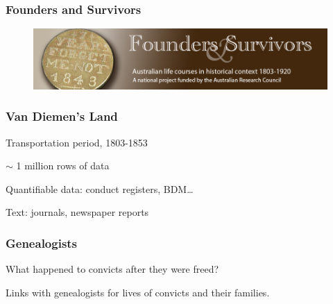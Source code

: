 \documentclass[ignorenonframetext,11pt]{beamer}
\begin{document}
\begin{frame}
\frametitle{Founders and Survivors}
\label{foundersandsurvivors}

\begin{figure}
	\label{foundersandsurvivors}
	\begin{center}
	\includegraphics[keepaspectratio,width=\textwidth, height=.75\textheight]{images/logo.jpg}
	\end{center}
	\end{figure}
	



\end{frame}
		

\begin{frame}
\frametitle{Van Diemen's Land}
\label{vandiemensland}

Transportation period, 1803-1853


\ensuremath{\sim} 1 million rows of data


Quantifiable data: conduct registers, BDM{\ldots}


Text: journals, newspaper reports



\end{frame}
		

\begin{frame}
\frametitle{Genealogists}
\label{genealogists}

What happened to convicts after they were freed?


Links with genealogists for lives of convicts and their families.



\end{frame}
		
\end{document}
